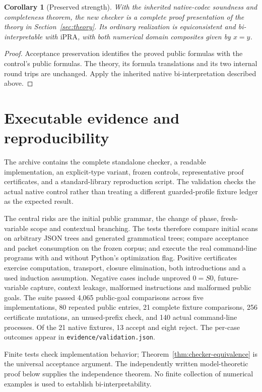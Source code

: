\documentclass[11pt,a4paper]{article}
\newtheorem{corollary}[theorem]{Corollary}
\theoremstyle{definition}\newtheorem{definition}[theorem]{Definition}
\theoremstyle{remark}\newtheorem{remark}[theorem]{Remark}
\newcommand{\ipra}{\mathrm{iPRA}}
\begin{document}
\begin{corollary}[Preserved strength]
With the inherited native-codec soundness and completeness theorem, the
new checker is a complete proof presentation of the theory in
Section~\ref{sec:theory}. Its ordinary realization is equiconsistent and
bi-interpretable with $\ipra$, with both numerical domain composites
given by $x=y$.
\end{corollary}
\begin{proof}
Acceptance preservation identifies the proved public formulas with the
control's public formulas. The theory, its formula translations and its
two internal round trips are unchanged. Apply the inherited native
bi-interpretation described above.
\end{proof}

\section{Executable evidence and reproducibility}
\label{sec:validation}
The archive contains the complete standalone checker, a readable
implementation, an explicit-type variant, frozen controls, representative
proof certificates, and a standard-library reproduction script. The
validation checks the actual native control rather than treating a
different guarded-profile fixture ledger as the expected result.

The central risks are the initial public grammar, the change of phase,
fresh-variable scope and contextual branching. The tests therefore
compare initial scans on arbitrary JSON trees and generated grammatical
trees; compare acceptance and packet consumption on the frozen corpus;
and execute the real command-line programs with and without Python's
optimization flag. Positive certificates exercise computation, transport,
closure elimination, both introductions and a used induction assumption.
Negative cases include unproved $0=S0$, future-variable capture, context
leakage, malformed instructions and malformed public goals. The suite passed
4,065 public-goal comparisons across five implementations, 80 repeated
public entries, 21 complete fixture comparisons, 256 certificate mutations,
an unused-prefix check, and 140 actual command-line processes. Of the
21 native fixtures, 13 accept and eight reject. The per-case outcomes
appear in \texttt{evidence/validation.json}.

Finite tests check implementation behavior; Theorem~\ref{thm:checker-equivalence}
is the universal acceptance argument. The independently written
model-theoretic proof below supplies the independence theorem. No finite
collection of numerical examples is used to establish bi-interpretability.
\end{document}
